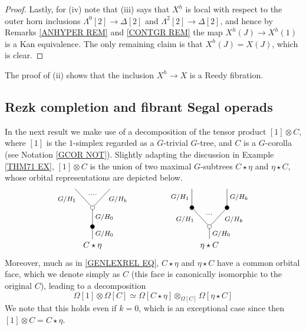 \documentclass[a4paper,10pt
,draft
]{article}%
\begin{document}
\begin{proof}
Lastly, for (iv) note that (iii) says that $X^h$ is local with respect to the outer horn inclusions
$\Lambda^0[2] \to \Delta[2]$ and
$\Lambda^2[2] \to \Delta[2]$, 
and hence by Remarks 
\ref{ANHYPER REM} and \ref{CONTGR REM}
the map 
$X^h(J) \to X^h(1)$ 
is a Kan equivalence.
The only remaining claim is that
$X^h(J) = X(J)$, which is clear.
\end{proof}

\begin{remark}
The proof of (ii) shows that the inclusion $X^h \to X$ is a Reedy fibration.
\end{remark}

\subsection{Rezk completion and fibrant Segal operads}
\label{REZKCOMP SEC}

In the next result we make use of a decomposition of the tensor product $[1] \otimes C$,
where $[1]$ is the $1$-simplex regarded as a $G$-trivial $G$-tree, and $C$ is a $G$-corolla 
(see Notation \ref{GCOR NOT}). Slightly adapting the discussion
in Example \ref{THM71 EX}, $[1] \otimes C$ is the union of two maximal $G$-subtrees $C \star \eta$ and $\eta \star C$,
whose orbital representations are depicted below.
\[
\begin{tikzpicture}
[grow=up,auto,level distance=2.3em,every node/.style = {font=\footnotesize},dummy/.style={circle,draw,inner sep=0pt,minimum size=1.75mm}]
	\node at (0,0) [font=\normalsize] {$C \star \eta$}
		child{node [dummy,fill=black] {}
			child{node [dummy] {}
				child{
				edge from parent node [swap,near end] {$G/H_k$} node [name=Kn] {}}
				child{
				edge from parent node [near end] {$G/H_1$}
node [name=Kone,swap] {}}
			edge from parent node [swap] {$G/H_0$}}
		edge from parent node [swap] {$G/H_0$}};
		\draw [dotted,thick] (Kone) -- (Kn) ;
	\node at (5,0) [font=\normalsize] {$\eta \star C$}
		child{node [dummy] {}
			child{node [dummy,fill=black] {}
				child{
				edge from parent node [swap] {$G/H_k$}}
			edge from parent node [swap,near end] {$G/H_k$} node [name=Kn] {}}
			child{node [dummy,fill=black] {}
				child{
				edge from parent node {$G/H_1$}}
			edge from parent node [near end] {$G/H_1$}
node [name=Kone,swap] {}}
		edge from parent node [swap] {$G/H_0$}
		};
		\draw [dotted,thick] (Kone) -- (Kn) ;
\end{tikzpicture}
\]
Moreover, much as in \eqref{GENLEXREL EQ}, 
$C \star \eta$ and $\eta \star C$ have a common orbital face, which we denote simply as $C$
(this face is canonically isomorphic to the original $C$),
leading to a decomposition
\[
\Omega[1] \otimes \Omega[C]
	\simeq
\Omega[C \star \eta] \otimes_{\Omega[C]} \Omega[\eta \star C]
\]
We note that this holds even if $k=0$, 
which is an exceptional case since then
$[1] \otimes C = C \star \eta$.
\end{document}
